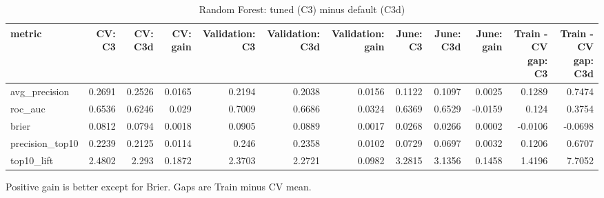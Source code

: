 \begin{table}[htbp]
\centering
\small
\caption{Random Forest: tuned (C3) minus default (C3d)}
\begin{tabular}{lrrrrrrrrrrr}
\toprule
metric & CV: C3 & CV: C3d & CV: gain & Validation: C3 & Validation: C3d & Validation: gain & June: C3 & June: C3d & June: gain & Train - CV gap: C3 & Train - CV gap: C3d \\
\midrule
avg\_precision & 0.2691 & 0.2526 & 0.0165 & 0.2194 & 0.2038 & 0.0156 & 0.1122 & 0.1097 & 0.0025 & 0.1289 & 0.7474 \\
roc\_auc & 0.6536 & 0.6246 & 0.029 & 0.7009 & 0.6686 & 0.0324 & 0.6369 & 0.6529 & -0.0159 & 0.124 & 0.3754 \\
brier & 0.0812 & 0.0794 & 0.0018 & 0.0905 & 0.0889 & 0.0017 & 0.0268 & 0.0266 & 0.0002 & -0.0106 & -0.0698 \\
precision\_top10 & 0.2239 & 0.2125 & 0.0114 & 0.246 & 0.2358 & 0.0102 & 0.0729 & 0.0697 & 0.0032 & 0.1206 & 0.6707 \\
top10\_lift & 2.4802 & 2.293 & 0.1872 & 2.3703 & 2.2721 & 0.0982 & 3.2815 & 3.1356 & 0.1458 & 1.4196 & 7.7052 \\
\bottomrule
\end{tabular}
\par\smallskip\begin{minipage}{\linewidth}\footnotesize Positive gain is better except for Brier. Gaps are Train minus CV mean.\end{minipage}
\end{table}

